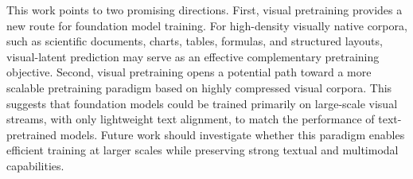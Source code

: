 This work points to two promising directions. 
First, visual pretraining provides a new route for foundation model training. 
For high-density visually native corpora, such as scientific documents, charts, tables, formulas, and structured layouts, visual-latent prediction may serve as an effective complementary pretraining objective. 
Second, visual pretraining opens a potential path toward a more scalable pretraining paradigm based on highly compressed visual corpora. 
This suggests that foundation models could be trained primarily on large-scale visual streams, with only lightweight text alignment, to match the performance of text-pretrained models.
Future work should investigate whether this paradigm enables efficient training at larger scales while preserving strong textual and multimodal capabilities.
